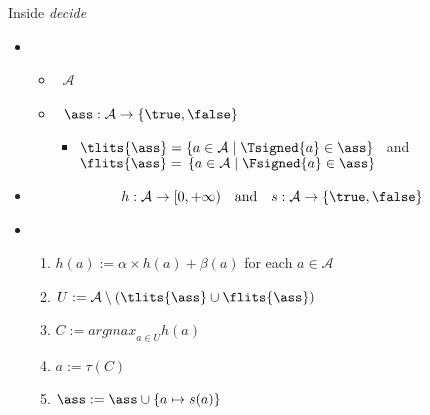 \begin{frame}{Inside \alert<1>{\textit{decide}}}
  \bigskip
  \begin{itemize}
  \item<2-> 
    \begin{itemize}
    \item {}       \ $\mathcal{A}$
    \item {} \ $\ass: \mathcal{A}\to\{\true,\false\}$
      \begin{itemize}
      \item[]
        $\tlits{\ass}=\{a\in\mathcal{A}\mid\Tsigned{a}\in\ass\}$ \ and \
        $\flits{\ass}=\,\{a\in\mathcal{A}\mid\Fsigned{a}\in\ass\}$
      \end{itemize}
    \end{itemize}
  \item<3-> 
    \[
    h: \mathcal{A}\to[0,+\infty)
    \quad\text{and}\quad
    s: \mathcal{A}\to\{\true,\false\}
    \]
  \item<4-> 
  \medskip
    \begin{enumerate}
    \item $h(a) := \alpha\times h(a) + \beta(a)$ \hfill for each $a\in\mathcal{A}\qquad$
    \item $U:=\mathcal{A}\setminus (\tlits{\ass}\cup\flits{\ass})$
    \item $C:= \textit{argmax}_{a\in U}h(a)$
    \item $a:= \tau(C)$
    \item $\ass := \ass\cup\{a\mapsto s(a)\}$
    \end{enumerate}
  \end{itemize}
\end{frame}
%
